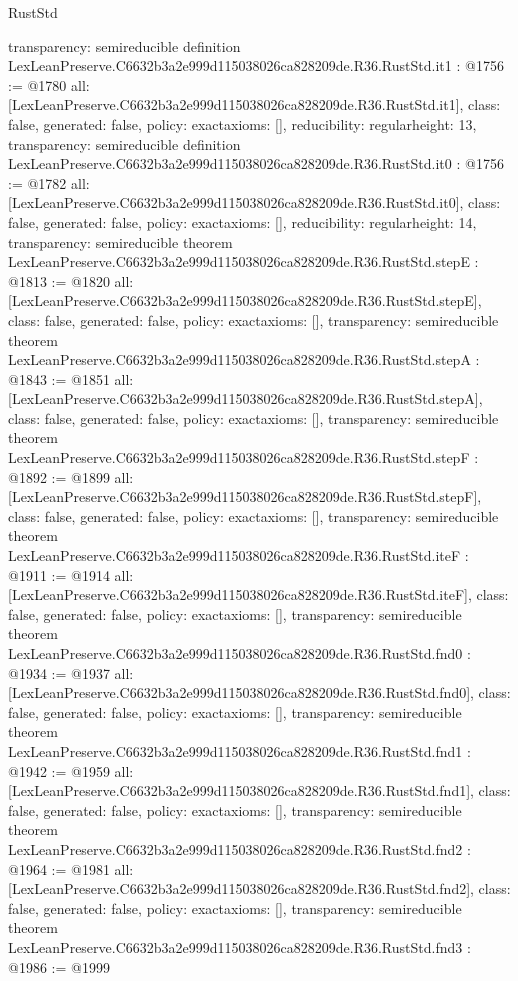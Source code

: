 \begin{lexlean}{RustStd}
\begin{coremodule}
{  transparency: semireducible
}
definition LexLeanPreserve.C6632b3a2e999d115038026ca828209de.R36.RustStd.it1 : @1756 := @1780 {
  all: [LexLeanPreserve.C6632b3a2e999d115038026ca828209de.R36.RustStd.it1],
  class: false,
  generated: false,
  policy: exact{axioms: []},
  reducibility: regular{height: 13},
  transparency: semireducible
}
definition LexLeanPreserve.C6632b3a2e999d115038026ca828209de.R36.RustStd.it0 : @1756 := @1782 {
  all: [LexLeanPreserve.C6632b3a2e999d115038026ca828209de.R36.RustStd.it0],
  class: false,
  generated: false,
  policy: exact{axioms: []},
  reducibility: regular{height: 14},
  transparency: semireducible
}
theorem LexLeanPreserve.C6632b3a2e999d115038026ca828209de.R36.RustStd.stepE : @1813 := @1820 {
  all: [LexLeanPreserve.C6632b3a2e999d115038026ca828209de.R36.RustStd.stepE],
  class: false,
  generated: false,
  policy: exact{axioms: []},
  transparency: semireducible
}
theorem LexLeanPreserve.C6632b3a2e999d115038026ca828209de.R36.RustStd.stepA : @1843 := @1851 {
  all: [LexLeanPreserve.C6632b3a2e999d115038026ca828209de.R36.RustStd.stepA],
  class: false,
  generated: false,
  policy: exact{axioms: []},
  transparency: semireducible
}
theorem LexLeanPreserve.C6632b3a2e999d115038026ca828209de.R36.RustStd.stepF : @1892 := @1899 {
  all: [LexLeanPreserve.C6632b3a2e999d115038026ca828209de.R36.RustStd.stepF],
  class: false,
  generated: false,
  policy: exact{axioms: []},
  transparency: semireducible
}
theorem LexLeanPreserve.C6632b3a2e999d115038026ca828209de.R36.RustStd.iteF : @1911 := @1914 {
  all: [LexLeanPreserve.C6632b3a2e999d115038026ca828209de.R36.RustStd.iteF],
  class: false,
  generated: false,
  policy: exact{axioms: []},
  transparency: semireducible
}
theorem LexLeanPreserve.C6632b3a2e999d115038026ca828209de.R36.RustStd.fnd0 : @1934 := @1937 {
  all: [LexLeanPreserve.C6632b3a2e999d115038026ca828209de.R36.RustStd.fnd0],
  class: false,
  generated: false,
  policy: exact{axioms: []},
  transparency: semireducible
}
theorem LexLeanPreserve.C6632b3a2e999d115038026ca828209de.R36.RustStd.fnd1 : @1942 := @1959 {
  all: [LexLeanPreserve.C6632b3a2e999d115038026ca828209de.R36.RustStd.fnd1],
  class: false,
  generated: false,
  policy: exact{axioms: []},
  transparency: semireducible
}
theorem LexLeanPreserve.C6632b3a2e999d115038026ca828209de.R36.RustStd.fnd2 : @1964 := @1981 {
  all: [LexLeanPreserve.C6632b3a2e999d115038026ca828209de.R36.RustStd.fnd2],
  class: false,
  generated: false,
  policy: exact{axioms: []},
  transparency: semireducible
}
theorem LexLeanPreserve.C6632b3a2e999d115038026ca828209de.R36.RustStd.fnd3 : @1986 := @1999 {
}
\end{coremodule}
\end{lexlean}
